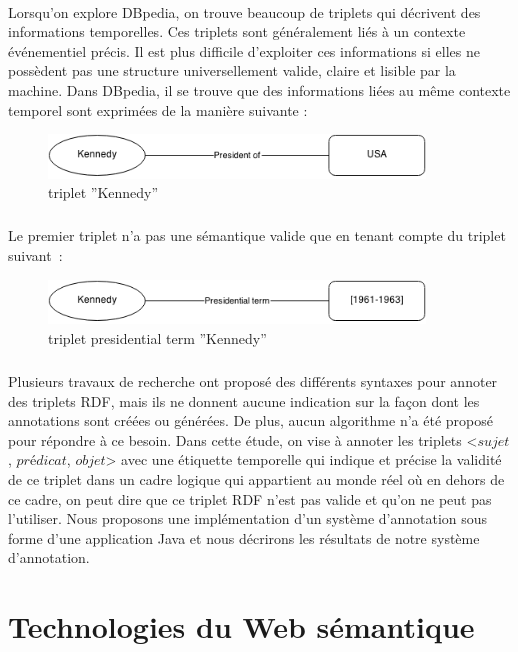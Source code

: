 \paragraph{}
Lorsqu’on explore DBpedia, on trouve beaucoup de triplets qui décrivent des informations temporelles. Ces triplets sont généralement liés à un contexte événementiel précis.
Il est plus difficile d’exploiter ces informations si elles ne possèdent pas une structure universellement valide, claire et lisible par la machine. Dans DBpedia, il se trouve que des informations liées au même contexte temporel sont exprimées de la manière suivante : 
\begin{figure}[H]
        \centering
                \centering
                \includegraphics[width=10cm]{ken.png}
               \caption{triplet ''Kennedy''}

\end{figure}
\subparagraph{}
Le premier triplet n'a pas une sémantique valide que en tenant compte du triplet suivant~: 
\begin{figure}[H]
        \centering
                \centering
                \includegraphics[width=10cm]{presidterm.png}
               \caption{triplet presidential term ''Kennedy''}

\end{figure}
\subparagraph{}
Plusieurs travaux de recherche ont proposé des différents syntaxes pour annoter des triplets RDF, mais ils ne donnent aucune indication sur la façon dont les annotations sont créées ou générées.
De plus, aucun algorithme n'a été proposé pour répondre à ce besoin.
Dans cette étude, on vise à annoter les triplets <$sujet$, $prédicat$, $objet$> avec une étiquette temporelle qui indique et précise la validité de ce triplet dans un cadre logique qui appartient au monde réel où en dehors de ce cadre, on peut dire que ce triplet RDF n'est pas valide et qu'on ne peut pas l'utiliser. Nous proposons une implémentation d'un système d'annotation sous forme d'une application Java et nous décrirons les résultats de notre système d'annotation.
\section{Technologies du Web sémantique}
